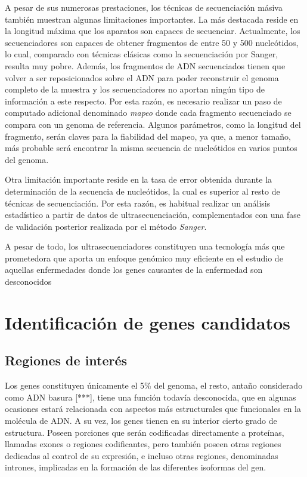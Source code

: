 \medskip
A pesar de sus numerosas prestaciones, los técnicas de secuenciación másiva también muestran algunas limitaciones importantes. La más destacada reside en la longitud máxima que los aparatos son capaces de secuenciar. Actualmente, los secuenciadores son capaces de obtener fragmentos de entre 50 y 500 nucleótidos, lo cual, comparado con técnicas clásicas como la secuenciación por Sanger, resulta muy pobre. Además, los fragmentos de ADN secuenciados tienen que volver a ser reposicionados sobre el ADN para poder reconstruir el genoma completo de la muestra y los secuenciadores no aportan ningún tipo de información a este respecto. Por esta razón, es necesario realizar un paso de computado adicional denominado \emph{mapeo} donde cada fragmento secuenciado se compara con un genoma de referencia. Algunos parámetros, como la longitud del fragmento, serán claves para la fiabilidad del mapeo, ya que, a menor tamaño, más probable será encontrar la misma secuencia de nucleótidos en varios puntos del genoma. 

\medskip
Otra limitación importante reside en la tasa de error obtenida durante la determinación de la secuencia de nucleótidos, la cual es superior al resto de técnicas de secuenciación. Por esta razón, es habitual realizar un análisis estadístico a partir de datos de ultrasecuenciación, complementados con una fase de validación posterior realizada por el método \emph{Sanger}.

\medskip
A pesar de todo, los ultrasecuenciadores constituyen una tecnología más que prometedora que aporta un enfoque genómico muy eficiente en el estudio de aquellas enfermedades donde los genes causantes de la enfermedad son desconocidos


\section{Identificación de genes candidatos}


\subsection{Regiones de interés}

Los genes constituyen únicamente el 5\% del genoma, el resto, antaño considerado como ADN basura [***], tiene una función todavía desconocida, que en algunas ocasiones estará relacionada con aspectos más estructurales que funcionales en la molécula de ADN. A su vez, los genes tienen en su interior cierto grado de estructura. Poseen porciones que serán codificadas directamente a proteínas, llamadas exones o regiones codificantes, pero también poseen otras regiones dedicadas al control de su expresión, e incluso otras regiones, denominadas intrones, implicadas en la formación de las diferentes isoformas del gen.


